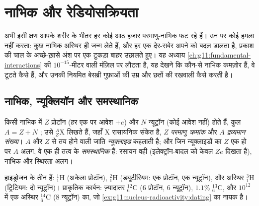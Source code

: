 \chapter{नाभिक और रेडियोसक्रियता}\label{ch:g11:nucleus-radioactivity}

अभी इसी क्षण आपके शरीर के भीतर हर  कोई आठ हज़ार परमाणु-नाभिक फट रहे हैं।
उन पर कोई हमला नहीं करता: कुछ नाभिक अस्थिर ही जन्म लेते हैं, और हर एक देर-सबेर
अपने को बदल डालता है, प्रकाश की चाल के अच्छे-ख़ासे अंश पर एक टुकड़ा बाहर उछालते
हुए। यह अध्याय \cref{ch:g11:fundamental-interactions} की $10^{-15}$-मीटर वाली मंज़िल पर लौटता है, यह देखने कि कौन-से
नाभिक कमज़ोर हैं, वे टूटते कैसे हैं, और उनकी नियमित बेसब्री गुफ़ाओं की उम्र और
छतों की रखवाली कैसे करती है।

\section{नाभिक, न्यूक्लियॉन और समस्थानिक}

\begin{definition}[नाभिकीय संकेतन]\label{def:g11:nucleus-radioactivity:notation}
किसी नाभिक में $Z$ प्रोटॉन (हर एक पर आवेश $+e$) और $N$ न्यूट्रॉन
(कोई आवेश नहीं) होते हैं, कुल $A = Z + N$ ; उसे ${}^{A}_{Z}\mathrm{X}$ लिखते हैं,
जहाँ $\mathrm X$ रासायनिक संकेत है, $Z$ \emph{परमाणु क्रमांक} और $A$ \emph{द्रव्यमान संख्या}। $A$
और $Z$ से तय होने वाली जाति \emph{न्यूक्लाइड} कहलाती
है; और जिन न्यूक्लाइडों का $Z$ एक हो पर $A$ अलग, वे एक ही तत्व के
\emph{समस्थानिक} हैं: रसायन वही (इलेक्ट्रॉन-बादल को केवल
$Ze$ दिखता है), नाभिक और स्थिरता अलग।
\end{definition}

\begin{example}[हाइड्रोजन और कार्बन]\label{ex:g11:nucleus-radioactivity:hc}
हाइड्रोजन के तीन  हैं: ${}^{1}_{1}\mathrm{H}$ (अकेला प्रोटॉन), ${}^{2}_{1}\mathrm{H}$
(ड्यूटीरियम: एक प्रोटॉन, एक न्यूट्रॉन), और अस्थिर ${}^{3}_{1}\mathrm{H}$ (ट्रिटियम: दो
न्यूट्रॉन)। प्राकृतिक कार्बन: ज़्यादातर ${}^{12}_{6}\mathrm{C}$ ($6$ प्रोटॉन, $6$
न्यूट्रॉन), $1.1\%$ ${}^{13}_{6}\mathrm{C}$, और $10^{12}$ में एक  अस्थिर ${}^{14}_{6}\mathrm{C}$
($8$ न्यूट्रॉन) का, जो \cref{ex:g11:nucleus-radioactivity:dating} का नायक है।
\end{example}

